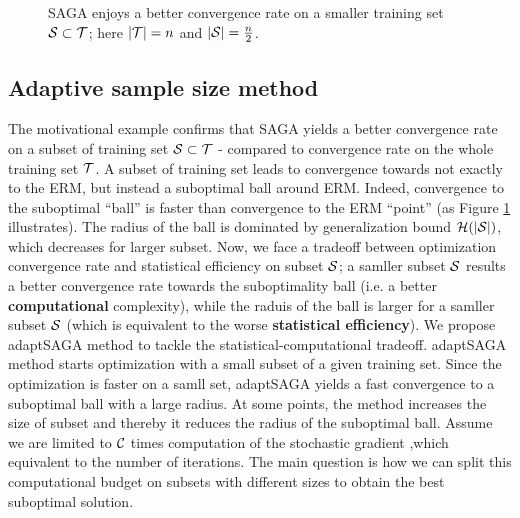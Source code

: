 \begin{figure}
    \begin{center}
    \end{center}
    \caption{SAGA enjoys a better convergence rate on a smaller training set
    $\S \subset \T$; here $|\T| = n$ and $|\S| = \frac{n}{2}$. }
  \label{fig:geometric}
\end{figure}

\subsection{Adaptive sample size method}
The motivational example confirms that SAGA yields a better convergence rate on
a subset of training set $\S \subset \T$ - compared to convergence rate on the whole
training set $\T$.
A subset of training set leads to convergence towards not exactly to the ERM,
but instead a suboptimal ball around ERM.
Indeed, convergence to the suboptimal ``ball'' is faster than convergence to the
ERM ``point'' (as Figure \ref{fig:geometric} illustrates). The radius of the
ball is dominated by generalization bound $\bound(|\S|)$, which decreases for
larger subset. Now, we face a tradeoff between optimization convergence rate and
statistical efficiency on subset $\S$; a samller subset $\S$ results a better
convergence rate towards the suboptimality ball (i.e. a better
\textbf{computational} complexity), while the raduis of the ball is larger for a
samller subset $\S$ (which is equivalent to the worse \textbf{statistical
efficiency}).
We propose adaptSAGA method to tackle the statistical-computational tradeoff.
adaptSAGA method starts optimization with a small subset of a given training
set.
Since the optimization is faster on a samll set, adaptSAGA yields a fast
convergence to a suboptimal ball with a large radius. At some points, the method increases
the size of subset and thereby it reduces the radius of the suboptimal ball.
Assume we are limited to $\C$ times computation of the stochastic gradient
,which equivalent to the number of iterations.
The main question is how we can split this computational budget on subsets
with different sizes to obtain the best suboptimal solution.
 
